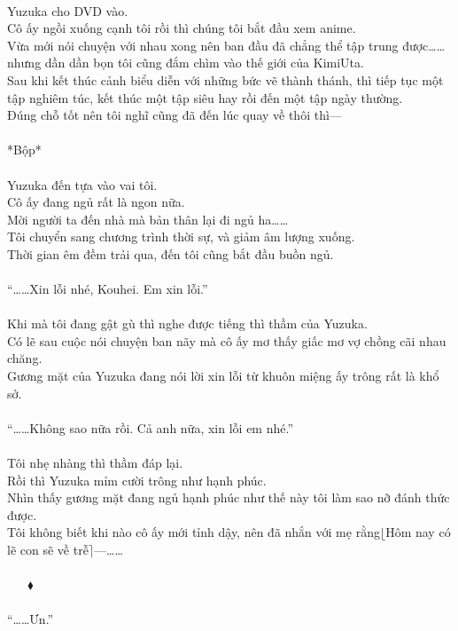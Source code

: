\documentclass[12pt,a4paper, twosides]{book}
\begin{document}
\\
Yuzuka cho DVD vào.\\
Cô ấy ngồi xuống cạnh tôi rồi thì chúng tôi bắt đầu xem anime.\\
Vừa mới nói chuyện với nhau xong nên ban đầu đã chẳng thể tập trung được……nhưng dần dần bọn tôi cũng đắm chìm vào thế giới của KimiUta.\\
Sau khi kết thúc cảnh biểu diễn với những bức vẽ thành thánh, thì tiếp tục một tập nghiêm túc, kết thúc một tập siêu hay rồi đến một tập ngày thường.\\
Đúng chỗ tốt nên tôi nghĩ cũng đã đến lúc quay về thôi thì—\\
\\
*Bộp*\\
\\
Yuzuka đến tựa vào vai tôi.\\
Cô ấy đang ngủ rất là ngon nữa.\\
Mời người ta đến nhà mà bản thân lại đi ngủ ha……\\
Tôi chuyển sang chương trình thời sự, và giảm âm lượng xuống.\\
Thời gian êm đềm trải qua, đến tôi cũng bắt đầu buồn ngủ.\\
\\
“……Xin lỗi nhé, Kouhei. Em xin lỗi.”\\
\\
Khi mà tôi đang gật gù thì nghe được tiếng thì thầm của Yuzuka.\\
Có lẽ sau cuộc nói chuyện ban nãy mà cô ấy mơ thấy giấc mơ vợ chồng cãi nhau chăng.\\
Gương mặt của Yuzuka đang nói lời xin lỗi từ khuôn miệng ấy trông rất là khổ sở.\\
\\
“……Không sao nữa rồi. Cả anh nữa, xin lỗi em nhé.”\\
\\
Tôi nhẹ nhàng thì thầm đáp lại.\\
Rồi thì Yuzuka mỉm cười trông như hạnh phúc.\\
Nhìn thấy gương mặt đang ngủ hạnh phúc như thế này tôi làm sao nỡ đánh thức được.\\
Tôi không biết khi nào cô ấy mới tỉnh dậy, nên đã nhắn với mẹ rằng$\lfloor$Hôm nay có lẽ con sẽ về trễ$\rceil$—……\\
\\
     $\mathbin{\blacklozenge}$\\
\\
“……Ưn.”\\
\end{document}
